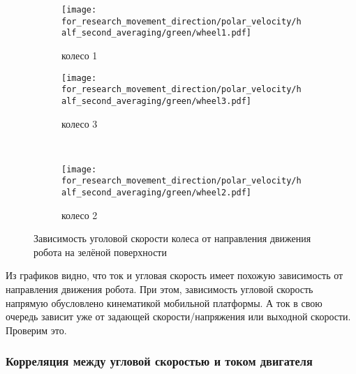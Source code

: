 \begin{figure}[H]
    \centering
    \begin{subfigure}{0.49\textwidth}
        \centering
        \texttt{[image: for\_research\_movement\_direction/polar\_velocity/half\_second\_averaging/green/wheel1.pdf]}
        \caption{колесо 1}
    \end{subfigure}
    \hspace{0.005\textwidth}
    \begin{subfigure}{0.49\textwidth}
        \centering
        \texttt{[image: for\_research\_movement\_direction/polar\_velocity/half\_second\_averaging/green/wheel3.pdf]}
        \caption{колесо 3}
    \end{subfigure} \\
    \vspace{4pt}
    \centering
    \begin{subfigure}{0.49\textwidth}
        \centering
        \texttt{[image: for\_research\_movement\_direction/polar\_velocity/half\_second\_averaging/green/wheel2.pdf]}
        \caption{колесо 2}
    \end{subfigure}
    \caption{Зависимость уголовой скорости колеса от направления движения робота на зелёной поверхности}
\end{figure}

Из графиков видно, что ток и угловая скорость имеет похожую зависимость от направления движения робота. При этом, зависимость угловой скорость напрямую обусловлено кинематикой мобильной платформы. А ток в свою очередь зависит уже от задающей скорости/напряжения или выходной скорости. Проверим это.

\subsubsection{Корреляция между угловой скоростью и током двигателя}

